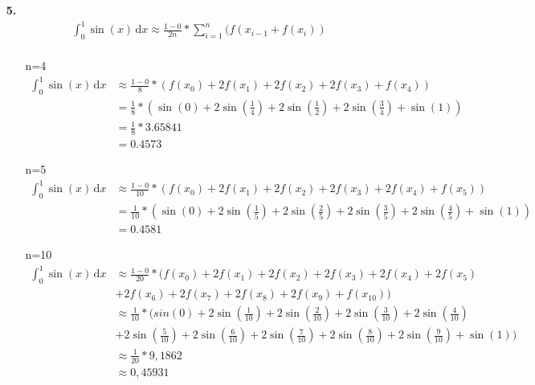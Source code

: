 \documentclass[a4paper,11pt,fleqn]{scrartcl}
\begin{document}
\begin{enumerate}
\item[\textbf{5.}]
	\begin{eqnarray*}
		\int_0^1 \! \sin(x) \, \mathrm{d}x \approx \frac{1-0}{2n}*\sum\limits_{i=1}^n(f(x_{i-1}+f(x_i))\\
	\end{eqnarray*}
	\begin{itemize}
		\item[n=4]
			\begin{align*}
				\int_0^1 \! \sin(x) \, \mathrm{d}x &\approx \frac{1-0}{8}*\left(f(x_0)+2f(x_1)+2f(x_2)+2f(x_3)+f(x_4)\right)\\
				&= \frac{1}{8}*\left(\sin\left(0\right)+2\sin\left(\frac{1}{4}\right)+2\sin\left(\frac{1}{2}\right)+2\sin\left(\frac{3}{4}\right)+\sin(1)\right) \\
				&= \frac{1}{8}*3.65841 \\
				&= 0.4573
			\end{align*}
		\item[n=5]
			\begin{align*}
				\int_0^1 \! \sin(x) \, \mathrm{d}x &\approx \frac{1-0}{10}*\left(f(x_0)+2f(x_1)+2f(x_2)+2f(x_3)+2f(x_4)+f(x_5)\right)\\
				&= \frac{1}{10}*\left(\sin\left(0\right)+2\sin\left(\frac{1}{5}\right)+2\sin\left(\frac{2}{5}\right)+2\sin\left(\frac{3}{5}\right)+2\sin\left(\frac{4}{5}\right)+\sin(1)\right) \\
				&= 0.4581
			\end{align*}
		\item[n=10]
			\begin{align*}
				\int_0^1 \! \sin(x) \, \mathrm{d}x &\approx \frac{1-0}{20}*(f(x_0)+2f(x_1)+2f(x_2)+2f(x_3)+2f(x_4)+2f(x_5)\\ &+2f(x_6)+2f(x_7)
+2f(x_8)+2f(x_9)+f(x_{10}))\\
				&\approx \frac{1}{10}*(sin(0)+2\sin\left(\frac{1}{10}\right)+2\sin\left(\frac{2}{10}\right)+2\sin\left(\frac{3}{10}\right)+2\sin\left(\frac{4}{10}\right)\\ &+2\sin\left(\frac{5}{10}\right)+2\sin\left(\frac{6}{10}\right)+2\sin\left(\frac{7}{10}\right)+2\sin\left(\frac{8}{10}\right)+2\sin\left(\frac{9}{10}\right)+\sin\left(1\right)) \\
				&\approx \frac{1}{20} * 9,1862 \\
				&\approx 0,45931
			\end{align*}
	\end{itemize}
            



\end{enumerate}
\end{document}
